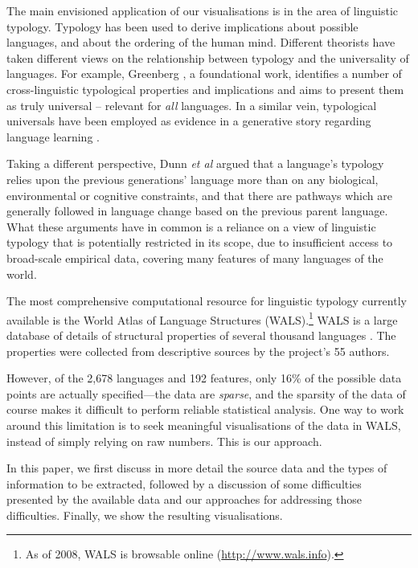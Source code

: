 \documentclass[11pt]{article}
\begin{document}
The main envisioned application of our visualisations is in the area of linguistic typology. Typology has been used to derive implications about possible languages, and about the ordering of the human mind. Different theorists have taken different views on the relationship between typology and the universality of languages. For example, Greenberg , a foundational work, identifies a number of cross-linguistic typological properties and implications and aims to present them as truly universal -- relevant for \textit{all} languages. In a similar vein, typological universals have been employed as evidence in a generative story regarding language learning \cite{chomsky}.

Taking a different perspective, Dunn {\it et al}  argued that a language's typology relies upon the previous generations' language more than on any biological, environmental or cognitive constraints, and that there are pathways which are generally followed in language change based on the previous parent language. What these arguments have in common is a reliance on a view of linguistic typology that is potentially restricted in its scope, due to insufficient access to broad-scale empirical data, covering many features of many languages of the world. 

The most comprehensive computational resource for linguistic typology currently available is the World Atlas of Language Structures (WALS).\footnote{As of 2008, WALS is browsable online (\url{http://www.wals.info}).}  WALS is a large database of details of structural properties of several thousand languages \cite{wals-2011}. The properties were collected from descriptive sources by the project's 55 authors.

However, of the 2,678 languages and 192 features, only 16\% of the possible data points are actually specified---the data are \emph{sparse}, and the sparsity of the data of course makes it difficult to perform reliable statistical analysis. One way to work around this limitation is to seek meaningful visualisations of the data in WALS, instead of simply relying on raw numbers. This is our approach. 

In this paper, we first discuss in more detail the source data and the types of information to be extracted, followed by a discussion of some difficulties presented by the available data and our approaches for addressing those difficulties. Finally, we show the resulting visualisations.
\end{document}
